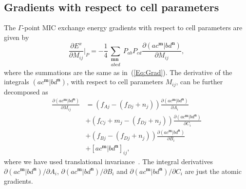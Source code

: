 \documentclass[prl,preprint,doublespace]{revtex4} %
\begin{document}
\subsection{Gradients with respect to cell parameters}
The $\Gamma$-point MIC exchange energy gradients with respect to cell parameters are given by
\begin{equation}\label{Eq:Xstress}
  \frac{\partial E^x}{\partial M_{ij}}\bigg|_P=
  -\frac{1}{4}\sum_{\substack{\mathbf{m}\mathbf{n}\\a b c d}}P_{ab}P_{cd}
  \frac{\partial(ac^\mathbf{m}|bd^\mathbf{n})}{\partial M_{ij}},
\end{equation}
where the summations are the same as in~(\ref{Eq:Grad}).
The derivative of the integrals $(ac^\mathbf{m}|bd^\mathbf{n})$, with respect 
to cell parameters $M_{ij}$, can be further decomposed as
\begin{equation}\label{Eq:DerMij}
  \begin{split}
    \frac{\partial (ac^\mathbf{m}|bd^\mathbf{n})}{\partial M_{ij}}
    &=(f_{Aj}-(f_{Dj}+n_j))\frac{\partial (ac^\mathbf{m}|bd^\mathbf{n})}{\partial A_{i}}\\
    &+(f_{Cj}+m_j-(f_{Dj}+n_j))\frac{\partial (ac^\mathbf{m}|bd^\mathbf{n})}{\partial C_{i}}\\
    &+(f_{Bj}-(f_{Dj}+n_j))\frac{\partial (ac^\mathbf{m}|bd^\mathbf{n})}{\partial B_{i}}\\
    &+[ac^\mathbf{m}|bd^\mathbf{n}]_{ij},
  \end{split}
\end{equation}
where we have used translational invariance~\cite{AKorminicki77}. 
The integral derivatives $\partial (ac^\mathbf{m}|bd^\mathbf{n})/\partial A_{i}$, 
$\partial (ac^\mathbf{m}|bd^\mathbf{n})/\partial B_{i}$ and 
$\partial (ac^\mathbf{m}|bd^\mathbf{n})/\partial C_{i}$ are just the atomic gradients.
\end{document}
